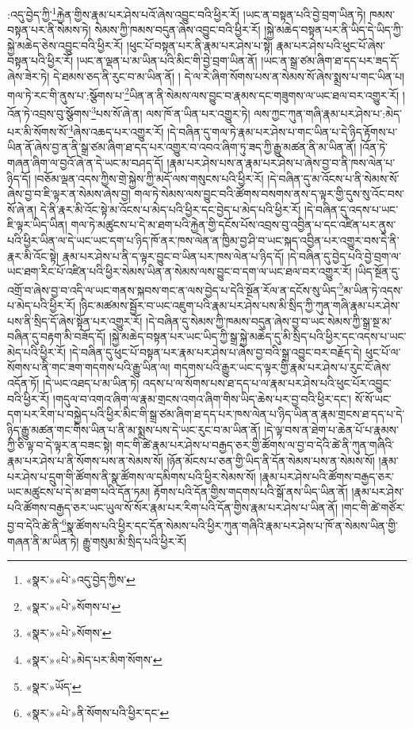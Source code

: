 :འདུ་བྱེད་ཀྱི་\footnote{«སྣར་»«པེ་»འདུ་བྱེད་ཀྱིས་}རྐྱེན་གྱིས་རྣམ་པར་ཤེས་པའོ་ཞེས་འབྱུང་བའི་ཕྱིར་རོ། །ཡང་ན་བསྟན་པའི་བྱེ་བྲག་ཡིན་ཏེ། ཁམས་བསྟན་པར་ནི་སེམས་ཏེ། སེམས་ཀྱི་ཁམས་བདུན་ཞེས་འབྱུང་བའི་ཕྱིར་རོ། །སྐྱེ་མཆེད་བསྟན་པར་ནི་ཡིད་དེ་ཡིད་ཀྱི་སྐྱེ་མཆེད་ཅེས་འབྱུང་བའི་ཕྱིར་རོ། །ཕུང་པོ་བསྟན་པར་ནི་རྣམ་པར་ཤེས་པ་སྟེ། རྣམ་པར་ཤེས་པའི་ཕུང་པོ་ཞེས་བསྟན་པའི་ཕྱིར་རོ། །ཡང་ན་ལྡན་པ་མ་ཡིན་པའི་མིང་གི་བྱེ་བྲག་ཡིན་ནོ། །ཡང་ན་སྒྲ་ཙམ་ཞིག་ཐ་དད་པར་ཟད་དོ་ཞེས་ཟེར་ཏེ། དེ་ཐམས་ཅད་ནི་རུང་བ་མ་ཡིན་ནོ། །
དེ་ལ་རེ་ཞིག་སོགས་པས་ན་སེམས་སོ་ཞེས་སྨྲས་པ་གང་ཡིན་པ། གལ་ཏེ་རང་གི་ནུས་པ་:སྩོགས་པ་\footnote{«སྣར་»«པེ་»སོགས་པ་}ཡིན་ན་ནི་སེམས་ལས་བྱུང་བ་རྣམས་དང་གཟུགས་ལ་ཡང་ཐལ་བར་འགྱུར་རོ། །འོན་ཏེ་འབྲས་བུ་སྩོགས་\footnote{«སྣར་»«པེ་»སོགས་}པས་སོ་ཞེ་ན། ལས་ཁོ་ན་ཡིན་པར་འགྱུར་ཏེ། ལས་ཀྱང་ཀུན་གཞི་རྣམ་པར་ཤེས་པ་:མེད་པར་མི་སོགས་སོ་\footnote{«སྣར་»«པེ་»མེད་པར་མིག་སོགས་}ཞེས་འཆད་པར་འགྱུར་རོ། །དེ་བཞིན་དུ་གལ་ཏེ་རྣམ་པར་ཤེས་པ་གང་ཡིན་པ་དེ་ཉིད་རྟོགས་པ་ཡིན་ནོ་ཞེས་བྱ་ན་ནི་སྒྲ་ཙམ་ཞིག་ཐ་དད་པར་འགྱུར་བ་འབའ་ཞིག་ཏུ་ཟད་ཀྱི་རྒྱུ་མཚན་ནི་མ་ཡིན་ནོ། །འོན་ཏེ་གཞན་ཞིག་ལ་བྱའོ་ཞེ་ན་དེ་ཡང་མ་བཤད་དོ། །རྣམ་པར་ཤེས་པས་ན་རྣམ་པར་ཤེས་པ་ཞེས་བྱ་བ་ནི་ཁས་ལེན་པ་ཉིད་དོ། །བཅོམ་ལྡན་འདས་ཀྱིས་གྲེ་སྐྱེས་ཀྱི་མདོ་ལས་གསུངས་པའི་ཕྱིར་རོ། །དེ་བཞིན་དུ་མ་འོངས་པ་ནི་སེམས་སོ་ཞེས་བྱ་བ་ཇི་ལྟར་ན་སེམས་ཞེས་བྱ། གལ་ཏེ་སེམས་ལས་བྱུང་བའི་ཚོགས་བསགས་ནས་ད་ལྟར་གྱི་དུས་སུ་འོང་བས་སོ་ཞེ་ན། དེ་ནི་རྣར་མི་འོང་སྟེ་མ་འོངས་པ་མེད་པའི་ཕྱིར་དང་བྱེད་པ་མེད་པའི་ཕྱིར་རོ། །དེ་བཞིན་དུ་འདས་པ་ཡང་ཇི་ལྟར་ཡིད་ཡིན། གལ་ཏེ་མཚུངས་པ་དེ་མ་ཐག་པའི་རྐྱེན་གྱི་དངོས་པོས་འབྲས་བུ་འབྱིན་པ་དང་འཛིན་པར་ནུས་པའི་ཕྱིར་ཡིན་ལ་དེ་ཡང་ཡང་དག་པ་ཉིད་ཁོ་ནར་ཁས་ལེན་ན་ཁྱིམ་བྱ་ཤི་བ་ཡང་སྐད་འབྱིན་པར་འགྱུར་བས་དེ་ནི་རྣར་མི་འོང་སྟེ། རྣམ་པར་ཤེས་པ་ནི་ད་ལྟར་བྱུང་བ་ཡིན་པར་ཁས་ལེན་པ་ཉིད་དོ། །དེ་བཞིན་དུ་བྱེད་པའི་བྱེ་བྲག་ལ་ཡང་ཐག་རིང་པོ་འཛིན་པའི་ཕྱིར་སེམས་ཡིན་ན་སེམས་ལས་བྱུང་བ་དག་ལ་ཡང་ཐལ་བར་འགྱུར་རོ། །ཡིད་སྔོན་དུ་འགྲོ་བ་ཞེས་བྱ་བ་འདི་ལ་ཡང་གནས་སྐབས་གང་ན་ལས་བྱེད་པ་དེའི་སྔོན་རོལ་ན་དངོས་སུ་ཡིད་\footnote{«སྣར་»ཡོད་}མ་ཡིན་ཏེ་འདས་པ་མེད་པའི་ཕྱིར་རོ། །ཉིང་མཚམས་སྦྱོར་བ་ཡང་འཇུག་པའི་རྣམ་པར་ཤེས་པས་མི་སྲིད་ཀྱི་ཀུན་གཞི་རྣམ་པར་ཤེས་པས་ནི་སྲིད་དོ་ཞེས་སྟོན་པར་འགྱུར་རོ། །དེ་བཞིན་དུ་སེམས་ཀྱི་ཁམས་བདུན་ཞེས་བྱ་བ་ཡང་སེམས་ཀྱི་སྒྲ་སྔ་མ་བཞིན་དུ་བརྟག་མི་བཟོད་དོ། །སྐྱེ་མཆེད་བསྟན་པར་ཡང་ཡིད་ཀྱི་སྒྲ་སྐྱེ་མཆེད་དུ་མི་སྲིད་པའི་ཕྱིར་དང་འདས་པ་ཡང་མེད་པའི་ཕྱིར་རོ། །དེ་བཞིན་དུ་ཕུང་པོ་བསྟན་པར་རྣམ་པར་ཤེས་པ་ཞེས་བྱ་བའི་སྒྲ་འབྱུང་བར་བརྗོད་དེ། ཕུང་པོ་ལ་སོགས་པ་ནི་གང་ཟག་གདགས་པའི་རྒྱུ་ཡིན་ལ། གདགས་པའི་རྒྱུར་ཡང་ད་ལྟར་གྱི་རྣམ་པར་ཤེས་པ་རུང་ངོ་ཞེས་འདོན་ཏོ། །དེ་ཡང་འཐད་པ་མ་ཡིན་ཏེ། འདས་པ་ལ་སོགས་པས་ཐ་དད་པ་ལ་རྣམ་པར་ཤེས་པའི་ཕུང་པོར་འབྱུང་བའི་ཕྱིར་རོ། །གདུལ་བ་འགའ་ཞིག་ལ་རྣམ་གྲངས་འགའ་ཞིག་གིས་ཡིད་ཆེས་པར་བྱ་བའི་ཕྱིར་དང་། སོ་སོ་ཡང་དག་པར་རིག་པ་བསྐྱེད་པའི་ཕྱིར་མིང་གི་སྒྲ་ཙམ་ཞིག་ཐ་དད་པར་ཁས་ལེན་པ་ཉིད་ཡིན་ན་རྣམ་གྲངས་ཐ་དད་པ་དེ་ཉིད་རྒྱུ་མཚན་གང་གིས་ཡིན་པ་ནི་མ་སྨྲས་པས་དེ་ཡང་རུང་བ་མ་ཡིན་ནོ། །དེ་ལྟ་བས་ན་ཐེག་པ་ཆེན་པོ་པ་རྣམས་ཀྱི་ཅི་ལྟ་བ་དེ་ལྟར་ན་བཟང་སྟེ། གང་གི་ཚེ་རྣམ་པར་ཤེས་པ་བརྒྱད་ཅར་གྱི་ཚོགས་ལ་བྱ་བ་དེའི་ཚེ་ནི་ཀུན་གཞིའི་རྣམ་པར་ཤེས་པ་ནི་སོགས་པས་ན་སེམས་སོ། །ཉོན་མོངས་པ་ཅན་གྱི་ཡིད་ནི་དོན་སེམས་པས་ན་སེམས་སོ། །རྣམ་པར་ཤེས་པ་དྲུག་གི་ཚོགས་ནི་སྣ་ཚོགས་ལ་དམིགས་པའི་ཕྱིར་སེམས་སོ། །རྣམ་པར་ཤེས་པའི་ཚོགས་བརྒྱད་ཅར་ཡང་མཚུངས་པ་དེ་མ་ཐག་པའི་དོན་ཏམ། རྟོགས་པའི་དོན་གྱིས་གདགས་པའི་སྒོ་ནས་ཡིད་ཡིན་ནོ། །རྣམ་པར་ཤེས་པའི་ཚོགས་བརྒྱད་ཅར་ཡང་ཡུལ་སོ་སོར་རྣམ་པར་རིག་པའི་དོན་གྱིས་རྣམ་པར་ཤེས་པ་ཡིན་ནོ། །གང་གི་ཚེ་གཙོར་བྱ་བ་དེའི་ཚེ་ནི་\footnote{«སྣར་»«པེ་»ནི་སོགས་པའི་ཕྱིར་དང་}སྣ་ཚོགས་པའི་ཕྱིར་དང་དོན་སེམས་པའི་ཕྱིར་ཀུན་གཞིའི་རྣམ་པར་ཤེས་པ་ཁོ་ན་སེམས་ཡིན་གྱི་གཞན་ནི་མ་ཡིན་ཏེ། རྒྱུ་གསུམ་མི་སྲིད་པའི་ཕྱིར་རོ། 
